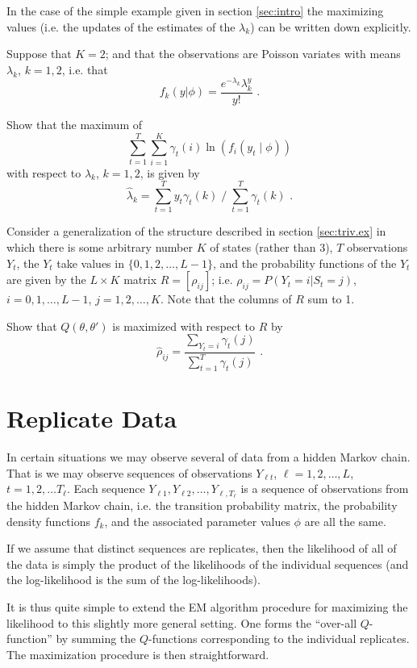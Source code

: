 In the case of the simple example given in section \ref{sec:intro}
the maximizing values (i.e. the updates of the estimates of the $\lambda_k$)
can be written down explicitly.

 Suppose that $K=2$; and that the observations are
Poisson variates with means $\lambda_k$, $k = 1, 2$, i.e. that
\[
f_k(y|\phi) = \frac{e^{-\lambda_k} \lambda_k^y}{y!} \mbox{ .}
\]

Show that the maximum of
\[
\sum_{t=1}^T \sum_{i=1}^K \gamma_t(i) \ln(f_i(y_t\;|\; \phi))
\]
with respect to $\lambda_k$, $k=1,2$, is given by
\[
\hat{\lambda}_k = \sum_{t=1}^T y_t \gamma_t(k) \; / \;
                  \sum_{t=1}^T \gamma_t(k) \mbox{ .}
\]

 Consider a generalization of the structure described
in section \ref{sec:triv.ex} in which there is some arbitrary number
$K$ of states (rather than 3), $T$ observations $Y_t$, the $Y_t$ take
values in $\{0,1,2,\ldots,L-1\}$, and the probability functions of
the $Y_t$ are given by the $L \times K$ matrix $R = [\rho_{ij}]$;
i.e. $\rho_{ij} = P(Y_t = i | S_t = j)$, $i=0,1, \ldots, L-1$,
$j=1,2, \ldots, K$.  Note that the columns of $R$ sum to 1.

Show that $Q(\theta,\theta')$ is maximized with respect to $R$ by
\[
\hat{\rho}_{ij} = \frac{\sum_{Y_t=i} \gamma_t(j)}{\sum_{t=1}^T \gamma_t(j)}
\mbox{ .}
\]

\section{Replicate Data}

In certain situations we may observe several  of
data from a hidden Markov chain.  That is we may observe sequences
of observations $Y_{\ell t}$, $\ell = 1, 2, \ldots, L$, $t = 1, 2, \ldots
T_{\ell}$.  Each sequence $Y_{\ell 1}, Y_{\ell 2}, \ldots, Y_{\ell, T_{\ell}}$
is a sequence of observations from the  hidden Markov chain,
i.e. the transition probability matrix, the probability density functions
$f_k$, and the associated parameter values $\phi$ are all the same.

If we assume that distinct sequences are  replicates,
then the likelihood of all of the data is simply the product of the
likelihoods of the individual sequences (and the log-likelihood is
the sum of the log-likelihoods).

It is thus quite simple to extend the EM algorithm procedure for
maximizing the likelihood to this slightly more general setting.
One forms the ``over-all $Q$-function'' by summing the $Q$-functions
corresponding to the individual replicates.  The maximization
procedure is then straightforward.

